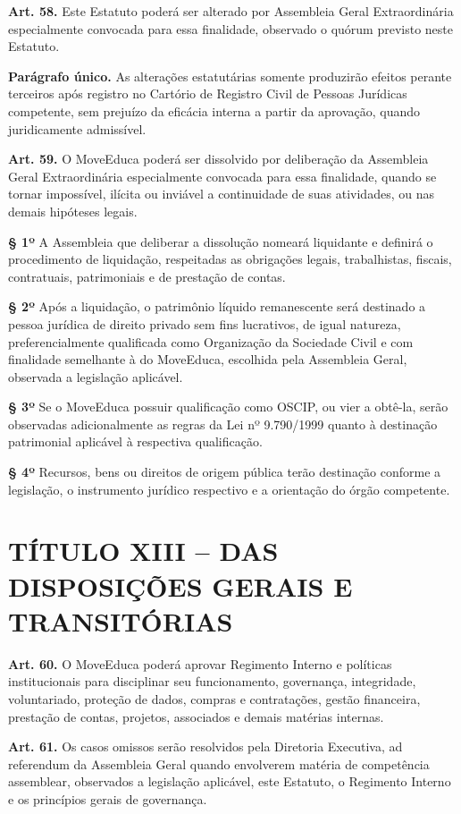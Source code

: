 \documentclass[11pt,a4paper]{article}
\begin{document}
\textbf{Art. 58.} Este Estatuto poderá ser alterado por Assembleia Geral Extraordinária especialmente convocada para essa finalidade, observado o quórum previsto neste Estatuto.

\textbf{Parágrafo único.} As alterações estatutárias somente produzirão efeitos perante terceiros após registro no Cartório de Registro Civil de Pessoas Jurídicas competente, sem prejuízo da eficácia interna a partir da aprovação, quando juridicamente admissível.

\textbf{Art. 59.} O MoveEduca poderá ser dissolvido por deliberação da Assembleia Geral Extraordinária especialmente convocada para essa finalidade, quando se tornar impossível, ilícita ou inviável a continuidade de suas atividades, ou nas demais hipóteses legais.

\textbf{§ 1º} A Assembleia que deliberar a dissolução nomeará liquidante e definirá o procedimento de liquidação, respeitadas as obrigações legais, trabalhistas, fiscais, contratuais, patrimoniais e de prestação de contas.

\textbf{§ 2º} Após a liquidação, o patrimônio líquido remanescente será destinado a pessoa jurídica de direito privado sem fins lucrativos, de igual natureza, preferencialmente qualificada como Organização da Sociedade Civil e com finalidade semelhante à do MoveEduca, escolhida pela Assembleia Geral, observada a legislação aplicável.

\textbf{§ 3º} Se o MoveEduca possuir qualificação como OSCIP, ou vier a obtê-la, serão observadas adicionalmente as regras da Lei nº 9.790/1999 quanto à destinação patrimonial aplicável à respectiva qualificação.

\textbf{§ 4º} Recursos, bens ou direitos de origem pública terão destinação conforme a legislação, o instrumento jurídico respectivo e a orientação do órgão competente.

\section*{TÍTULO XIII -- DAS DISPOSIÇÕES GERAIS E TRANSITÓRIAS}

\textbf{Art. 60.} O MoveEduca poderá aprovar Regimento Interno e políticas institucionais para disciplinar seu funcionamento, governança, integridade, voluntariado, proteção de dados, compras e contratações, gestão financeira, prestação de contas, projetos, associados e demais matérias internas.

\textbf{Art. 61.} Os casos omissos serão resolvidos pela Diretoria Executiva, ad referendum da Assembleia Geral quando envolverem matéria de competência assemblear, observados a legislação aplicável, este Estatuto, o Regimento Interno e os princípios gerais de governança.
\end{document}
